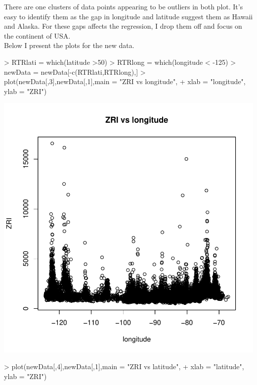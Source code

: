 \documentclass[a4paper]{article}
\begin{document}
There are one clusters of data points appearing to be outliers in both plot. It's easy to identify them as the gap in longitude and latitude suggest them as Hawaii and Alaska. For these gaps affects the regression, I drop them off and focus on the continent of USA.\\
Below I present the plots for the new data. 
\begin{Schunk}
\begin{Sinput}
> RTRlati = which(latitude >50)
> RTRlong = which(longitude < -125)
> newData = newData[-c(RTRlati,RTRlong),]
> plot(newData[,3],newData[,1],main = "ZRI vs longitude", 
+      xlab = "longitude", ylab = "ZRI")
\end{Sinput}
\end{Schunk}
\includegraphics{project_tex-test3}
\begin{Schunk}
\begin{Sinput}
> plot(newData[,4],newData[,1],main = "ZRI vs latitude", 
+      xlab = "latitude", ylab = "ZRI")
\end{Sinput}
\end{Schunk}
\end{document}
